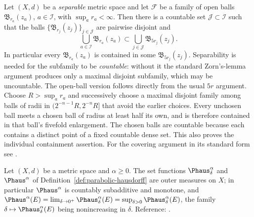 \documentclass[11pt,reqno]{amsart}
\begin{document}
\begin{externalinput}\label{ext:vitali}
Let $(X,d)$ be a \emph{separable} metric space and let $\mathcal{F}$ be a family
of open balls $\mathfrak{B}_{r_{a}}(z_{a})$, $a\in\mathcal{I}$, with
$\sup_{a}r_{a}<\infty$. Then there is a countable set
$\mathcal{J}\subset\mathcal{I}$ such that the balls
$\{\mathfrak{B}_{r_{j}}(z_{j})\}_{j\in\mathcal{J}}$ are pairwise disjoint and
\[
  \bigcup_{a\in\mathcal{I}}\mathfrak{B}_{r_{a}}(z_{a})
  \subset\bigcup_{j\in\mathcal{J}}\mathfrak{B}_{5r_{j}}(z_{j}) .
\]
In particular every $\mathfrak{B}_{r_{a}}(z_{a})$ is contained in some
$\mathfrak{B}_{5r_{j}}(z_{j})$. Separability is needed for the subfamily to be
\emph{countable}: without it the standard Zorn's-lemma argument produces only a
maximal disjoint subfamily, which may be uncountable.
The open-ball version follows directly from the usual $5r$ argument. Choose
$R>\sup_a r_a$ and successively choose a maximal disjoint family among
balls of radii in $(2^{-n-1}R,2^{-n}R]$ that avoid the earlier choices.
Every unchosen ball meets a chosen ball of radius at least half its own,
and is therefore contained in that ball's fivefold enlargement. The chosen
balls are countable because each contains a distinct point of a fixed
countable dense set. This also proves the individual containment assertion.
For the covering argument in its standard form see \cite[Thm.~2.1]{Mattila1995}.
\end{externalinput}

\begin{externalinput}\label{ext:hausdorff}
Let $(X,d)$ be a metric space and $\alpha\ge0$. The set functions
$\Phaus^{\alpha}_{\delta}$ and $\Phaus^{\alpha}$ of
Definition~\ref{def:parabolic-hausdorff} are outer measures on $X$; in
particular $\Phaus^{\alpha}$ is countably subadditive and monotone, and
$\Phaus^{\alpha}(E)=\lim_{\delta\to0^{+}}\Phaus^{\alpha}_{\delta}(E)
 =\sup_{\delta>0}\Phaus^{\alpha}_{\delta}(E)$, the family
$\delta\mapsto\Phaus^{\alpha}_{\delta}(E)$ being nonincreasing in $\delta$.
Reference: \cite[Ch.~4]{Mattila1995}.
\end{externalinput}
\end{document}

